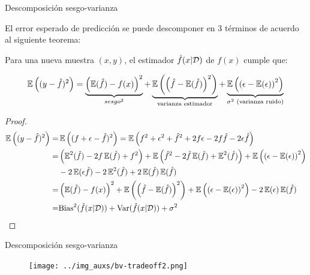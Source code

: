 \documentclass[handout, 9pt]{beamer}
\begin{document}
\begin{frame}{Descomposición sesgo-varianza}

El error esperado de predicción se puede descomponer en 3 términos de acuerdo al siguiente teorema:

\begin{theorem} Para una nueva muestra $(x,y)$, el estimador $\hat{f}(x|{\mathcal D})$ de $f(x)$ cumple que:

\begin{equation*}
	\operatorname{\mathbb{E}}\left((y-\hat{f})^2\right) = \underbrace{\left(\operatorname{\mathbb{E}}(\hat{f}) - f(x)\right)^2}_{sesgo^2} + \underbrace{\operatorname{\mathbb{E}}\left(\left(\hat{f}-\operatorname{\mathbb{E}}(\hat{f})\right)^2\right)}_{\text{varianza estimador}} + \underbrace{\operatorname{\mathbb{E}}\left(\left(\epsilon-\operatorname{\mathbb{E}}(\epsilon)\right)^2\right)}_{\sigma^2 \text{ (varianza ruido)}}
\end{equation*}
	
\end{theorem}

\begin{proof}

\begin{align*}
	\operatorname{\mathbb{E}}\left((y-\hat{f})^2\right) =& \operatorname{\mathbb{E}}\left((f+\epsilon-\hat{f})^2\right) = \operatorname{\mathbb{E}}\left(f^2+\epsilon^2+\hat{f}^2 +2f\epsilon - 2f\hat{f} - 2\epsilon \hat{f}\right)\\
	=&\left(\operatorname{\mathbb{E}}^2(\hat{f})-2f\operatorname{\mathbb{E}}(\hat{f}) + f^2\right) + \operatorname{\mathbb{E}}\left(\hat{f}^2-2\hat{f}\operatorname{\mathbb{E}}(\hat{f})+\operatorname{\mathbb{E}}^2(\hat{f})\right) + \operatorname{\mathbb{E}}\left(\left(\epsilon-\operatorname{\mathbb{E}}(\epsilon)\right)^2\right)\\
	& - 2\operatorname{\mathbb{E}}(\epsilon\hat{f})-2\operatorname{\mathbb{E}}^2(\hat{f})+2\operatorname{\mathbb{E}}(\hat{f})\operatorname{\mathbb{E}}(\hat{f})\\
	=& \left(\operatorname{\mathbb{E}}(\hat{f}) - f(x)\right)^2 + \operatorname{\mathbb{E}}\left(\left(\hat{f}-\operatorname{\mathbb{E}}(\hat{f})\right)^2\right) + \operatorname{\mathbb{E}}\left(\left(\epsilon-\operatorname{\mathbb{E}}(\epsilon)\right)^2\right) - 2\operatorname{\mathbb{E}}(\epsilon)\operatorname{\mathbb{E}}(\hat{f})\\
	= & \text{Bias}^2(\hat{f}(x|{\mathcal D})) + \text{Var}(\hat{f}(x|{\mathcal D})) + \sigma^2
\end{align*}

\end{proof} 

\end{frame}

\begin{frame}{Descomposición sesgo-varianza}

\begin{figure}[h!]
\centering
	\texttt{[image: ../img\_auxs/bv-tradeoff2.png]}
\end{figure}

\end{frame}
\end{document}
